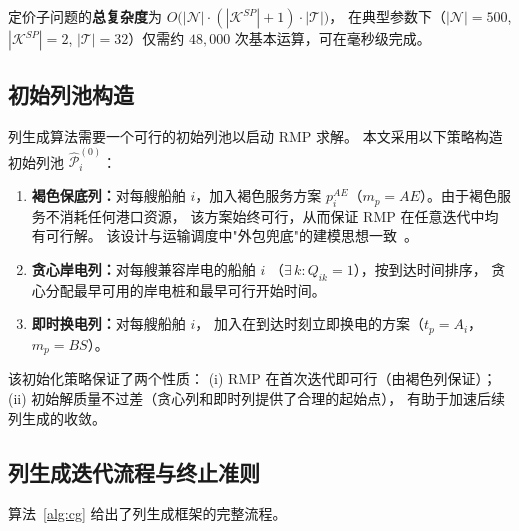 \documentclass[11pt,a4paper]{article}
\begin{document}
\noindent
定价子问题的\textbf{总复杂度}为
$O\!\big(|\mathcal{N}| \cdot (|\mathcal{K}^{SP}| + 1) \cdot |\mathcal{T}|\big)$，
在典型参数下（$|\mathcal{N}| = 500$, $|\mathcal{K}^{SP}| = 2$,
$|\mathcal{T}| = 32$）仅需约 $48{,}000$ 次基本运算，可在毫秒级完成。

\subsection{初始列池构造}

列生成算法需要一个可行的初始列池以启动 RMP 求解。
本文采用以下策略构造初始列池 $\hat{\mathcal{P}}_i^{(0)}$：

\begin{enumerate}
  \item \textbf{褐色保底列：}对每艘船舶 $i$，加入褐色服务方案
        $p_i^{AE}$（$m_p = AE$）。由于褐色服务不消耗任何港口资源，
        该方案始终可行，从而保证 RMP 在任意迭代中均有可行解。
        该设计与运输调度中"外包兜底"的建模思想一致~\cite{Cordeau2015}。
  \item \textbf{贪心岸电列：}对每艘兼容岸电的船舶 $i$
        （$\exists\, k: Q_{ik} = 1$），按到达时间排序，
        贪心分配最早可用的岸电桩和最早可行开始时间。
  \item \textbf{即时换电列：}对每艘船舶 $i$，
        加入在到达时刻立即换电的方案（$t_p = A_i$，$m_p = BS$）。
\end{enumerate}

\noindent
该初始化策略保证了两个性质：
(i) RMP 在首次迭代即可行（由褐色列保证）；
(ii) 初始解质量不过差（贪心列和即时列提供了合理的起始点），
有助于加速后续列生成的收敛。

\subsection{列生成迭代流程与终止准则}

算法~\ref{alg:cg} 给出了列生成框架的完整流程。
\end{document}
